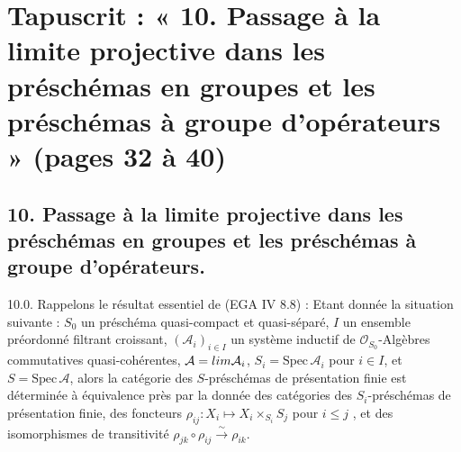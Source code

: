 \documentclass[11pt,a4paper]{article}
\begin{document}
\section*{Tapuscrit : « 10. Passage à la limite projective dans les préschémas en groupes et les préschémas à groupe d'opérateurs » (pages 32 à 40)}



\subsection*{10. Passage à la limite projective dans les préschémas en groupes et les préschémas à groupe d'opérateurs.}

10.0. Rappelons le résultat essentiel de (EGA IV 8.8) : Etant donnée la
situation suivante : $S_{0}$ un préschéma quasi-compact et quasi-séparé,
$I$ un ensemble préordonné filtrant croissant, $(\mathcal{A}_{i})_{i \in I}$
un système inductif de $\mathcal{O}_{S_{0}}$-Algèbres commutatives
quasi-cohérentes, $\mathcal{A} = \varinjlim \mathcal{A}_{i}$,
$S_{i} = \mathrm{Spec}\, \mathcal{A}_{i}$ pour $i \in I$, et
$S = \mathrm{Spec}\, \mathcal{A}$, alors la catégorie des $S$-préschémas de
présentation finie est déterminée à équivalence près par la donnée des
catégories des $S_{i}$-préschémas de présentation finie, des foncteurs
$\rho_{ij} \colon X_{i} \mapsto X_{i} \times_{S_{i}} S_{j}$ pour
$i \leqslant j$ , et des isomorphismes de
transitivité $\rho_{jk} \circ \rho_{ij} \xrightarrow{\sim} \rho_{ik}$.
 
\end{document}
